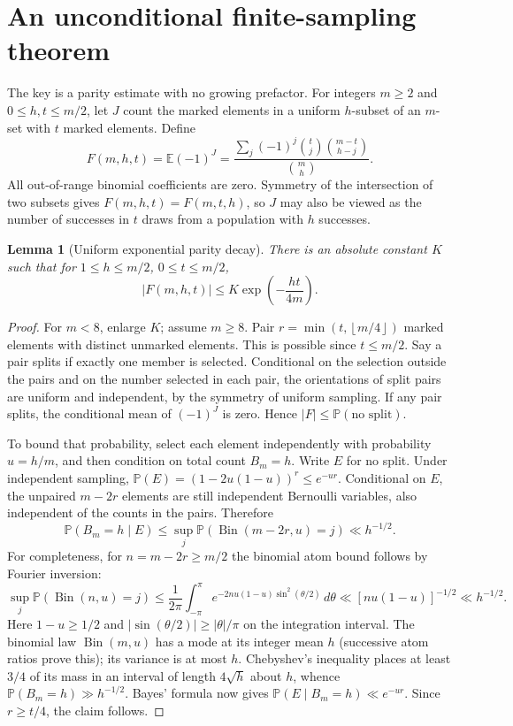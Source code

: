 \documentclass[11pt]{article}
\newtheorem{lemma}[theorem]{Lemma}
\theoremstyle{remark}\newtheorem{remark}[theorem]{Remark}
\newcommand{\E}{\mathbb E}
\newcommand{\Pp}{\mathbb P}
\newcommand{\floor}[1]{\left\lfloor #1\right\rfloor}
\begin{document}
\section{An unconditional finite-sampling theorem}
The key is a parity estimate with no growing prefactor. For integers $m\ge2$ and $0\le h,t\le m/2$, let $J$ count the marked elements in a uniform $h$-subset of an $m$-set with $t$ marked elements. Define
\begin{equation}\label{eq:parity}
 F(m,h,t)=\E(-1)^J=\frac{\sum_j(-1)^j\binom tj\binom{m-t}{h-j}}{\binom mh}.
\end{equation}
All out-of-range binomial coefficients are zero. Symmetry of the intersection of two subsets gives $F(m,h,t)=F(m,t,h)$, so $J$ may also be viewed as the number of successes in $t$ draws from a population with $h$ successes.

\begin{lemma}[Uniform exponential parity decay]\label{lem:decay}
There is an absolute constant $K$ such that for $1\le h\le m/2$, $0\le t\le m/2$,
\[
 |F(m,h,t)|\le K\exp\left(-\frac{ht}{4m}\right).
\]
\end{lemma}
\begin{proof}
For $m<8$, enlarge $K$; assume $m\ge8$. Pair $r=\min(t,\floor{m/4})$ marked elements with distinct unmarked elements. This is possible since $t\le m/2$. Say a pair splits if exactly one member is selected. Conditional on the selection outside the pairs and on the number selected in each pair, the orientations of split pairs are uniform and independent, by the symmetry of uniform sampling. If any pair splits, the conditional mean of $(-1)^J$ is zero. Hence $|F|\le\Pp(\text{no split})$.

To bound that probability, select each element independently with probability $u=h/m$, and then condition on total count $B_m=h$. Write $E$ for no split. Under independent sampling, $\Pp(E)=(1-2u(1-u))^r\le e^{-ur}$. Conditional on $E$, the unpaired $m-2r$ elements are still independent Bernoulli variables, also independent of the counts in the pairs. Therefore
\[
 \Pp(B_m=h\mid E)\le \sup_j\Pp(\operatorname{Bin}(m-2r,u)=j)\ll h^{-1/2}.
\]
For completeness, for $n=m-2r\ge m/2$ the binomial atom bound follows by Fourier inversion:
\[
 \sup_j\Pp(\operatorname{Bin}(n,u)=j)
 \le \frac1{2\pi}\int_{-\pi}^{\pi}e^{-2nu(1-u)\sin^2(\theta/2)}\,d\theta
 \ll [nu(1-u)]^{-1/2}\ll h^{-1/2}.
\]
Here $1-u\ge1/2$ and $|\sin(\theta/2)|\ge|\theta|/\pi$ on the integration interval. The binomial law $\operatorname{Bin}(m,u)$ has a mode at its integer mean $h$ (successive atom ratios prove this); its variance is at most $h$. Chebyshev's inequality places at least $3/4$ of its mass in an interval of length $4\sqrt h$ about $h$, whence $\Pp(B_m=h)\gg h^{-1/2}$. Bayes' formula now gives $\Pp(E\mid B_m=h)\ll e^{-ur}$. Since $r\ge t/4$, the claim follows.
\end{proof}
\end{document}
